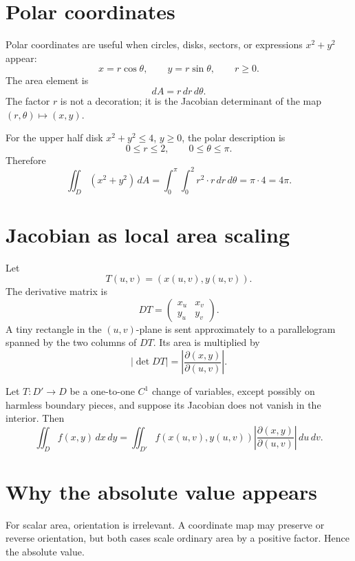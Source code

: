 \section{Polar coordinates}

Polar coordinates are useful when circles, disks, sectors, or expressions \(x^2+y^2\) appear:
\[
  x=r\cos\theta,\qquad y=r\sin\theta,\qquad r\ge0.
\]
The area element is
\[
  dA=r\,dr\,d\theta.
\]
The factor \(r\) is not a decoration; it is the Jacobian determinant of the map \((r,\theta)\mapsto(x,y)\).

\begin{example}
For the upper half disk \(x^2+y^2\le4\), \(y\ge0\), the polar description is
\[
  0\le r\le2,\qquad 0\le\theta\le\pi.
\]
Therefore
\[
  \iint_D (x^2+y^2)\,dA
  =\int_0^{\pi}\int_0^2 r^2\cdot r\,dr\,d\theta
  =\pi\cdot4=4\pi.
\]
\end{example}

\section{Jacobian as local area scaling}

Let
\[
  T(u,v)=(x(u,v),y(u,v)).
\]
The derivative matrix is
\[
  DT=
  \begin{pmatrix}
  x_u&x_v\\
  y_u&y_v
  \end{pmatrix}.
\]
A tiny rectangle in the \((u,v)\)-plane is sent approximately to a parallelogram spanned by the two columns of \(DT\).  Its area is multiplied by
\[
  |\det DT|=
  \left|\frac{\partial(x,y)}{\partial(u,v)}\right|.
\]

\begin{theorem}
Let \(T:D'\to D\) be a one-to-one \(C^1\) change of variables, except possibly on harmless boundary pieces, and suppose its Jacobian does not vanish in the interior.  Then
\[
  \iint_D f(x,y)\,dx\,dy
  =\iint_{D'} f(x(u,v),y(u,v))
  \left|\frac{\partial(x,y)}{\partial(u,v)}\right|\,du\,dv.
\]
\end{theorem}

\section{Why the absolute value appears}

For scalar area, orientation is irrelevant.  A coordinate map may preserve or reverse orientation, but both cases scale ordinary area by a positive factor.  Hence the absolute value.

